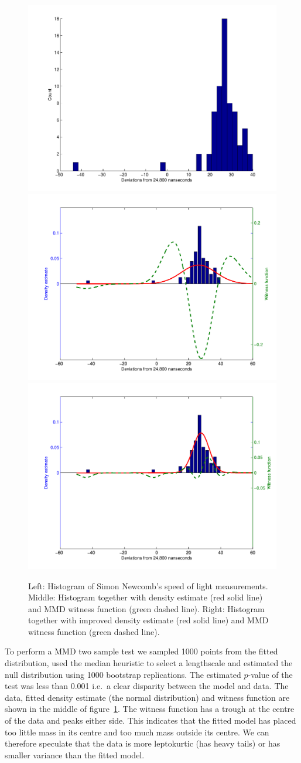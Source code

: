 \documentclass{article} %
\def\ie{i.e.\ }
\begin{document}
\begin{figure}[ht]
\centering
\includegraphics[width=0.32\columnwidth]{figures/newcomb_hist}
\includegraphics[width=0.32\columnwidth]{figures/newcomb_witness_1}
\includegraphics[width=0.32\columnwidth]{figures/newcomb_witness_2}
\caption{
Left: Histogram of Simon Newcomb's speed of light measurements.
Middle: Histogram together with density estimate (red solid line) and MMD witness function (green dashed line).
Right: Histogram together with improved density estimate (red solid line) and MMD witness function (green dashed line).
}
\label{fig:newcomb}
\end{figure}

To perform a MMD two sample test we sampled 1000 points from the fitted distribution, used the median heuristic to select a lengthscale and estimated the null distribution using 1000 bootstrap replications.
The estimated $p$-value of the test was less than 0.001 \ie a clear disparity between the model and data.
The data, fitted density estimate (the normal distribution) and witness function are shown in the middle of figure~\ref{fig:newcomb}.
The witness function has a trough at the centre of the data and peaks either side.
This indicates that the fitted model has placed too little mass in its centre and too much mass outside its centre.
We can therefore speculate that the data is more leptokurtic (has heavy tails) or has smaller variance than the fitted model.
\end{document}
